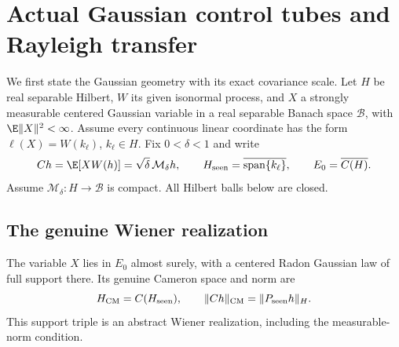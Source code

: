 \section{Actual Gaussian control tubes and Rayleigh transfer}
\label{S:actual-gaussian-tubes}

We first state the Gaussian geometry with its exact covariance scale.
Let $H$ be real separable Hilbert, $W$ its given isonormal process,
and $X$ a strongly measurable centered Gaussian variable in a real
separable Banach space $\mathscr B$, with $\E\|X\|^2<\infty$.
Assume every continuous linear coordinate has the form
$\ell(X)=W(k_\ell)$, $k_\ell\in H$.
Fix $0<\delta<1$ and write
\begin{equation}\label{E:tube-covariance-scale}
  Ch=\E[XW(h)]=\sqrt\delta\,\mathcal M_\delta h,\qquad
  H_{\rm seen}=\overline{\operatorname{span}\{k_\ell\}},\qquad
  E_0=\overline{C(H)} .
\end{equation}
Assume $\mathcal M_\delta:H\to\mathscr B$ is compact.
All Hilbert balls below are closed.

\subsection{The genuine Wiener realization}

\begin{proposition}
  \label{P:tube-wiener-realization}
  The variable $X$ lies in $E_0$ almost surely, with a centered
  Radon Gaussian law of full support there.
  Its genuine Cameron space and norm are
  \begin{equation}\label{E:tube-cameron-space}
    H_{\rm CM}=C(H_{\rm seen}),\qquad
    \|Ch\|_{\rm CM}=\|P_{\rm seen}h\|_H .
  \end{equation}
  This support triple is an abstract Wiener realization, including
  the measurable-norm condition.
\end{proposition}

